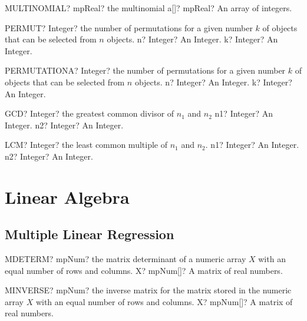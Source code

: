 \documentclass[12pt,a4paper,openany]{book}
\begin{document}
\begin{mpFunctionsExtract}
\mpWorksheetFunctionOneNotImplemented
{MULTINOMIAL? mpReal? the multinomial}
{a[]? mpReal? An array of integers.}
\end{mpFunctionsExtract}

\begin{mpFunctionsExtract}
\mpWorksheetFunctionTwoNotImplemented
{PERMUT? Integer? the number of permutations for a given number $k$ of objects that can be selected from $n$ objects.}
{n? Integer? An Integer.}
{k? Integer? An Integer.}
\end{mpFunctionsExtract}

\begin{mpFunctionsExtract}
\mpWorksheetFunctionTwoNotImplemented
{PERMUTATIONA? Integer? the number of permutations for a given number $k$ of objects that can be selected from $n$ objects.}
{n? Integer? An Integer.}
{k? Integer? An Integer.}
\end{mpFunctionsExtract}

\begin{mpFunctionsExtract}
\mpWorksheetFunctionTwoNotImplemented
{GCD? Integer? the greatest common divisor of $n_1$ and $n_2$}
{n1? Integer? An Integer.}
{n2? Integer? An Integer.}
\end{mpFunctionsExtract}

\begin{mpFunctionsExtract}
\mpWorksheetFunctionTwoNotImplemented
{LCM? Integer? the least common multiple of $n_1$ and $n_2$.}
{n1? Integer? An Integer.}
{n2? Integer? An Integer.}
\end{mpFunctionsExtract}

\chapter{Linear Algebra}

\section{Multiple Linear Regression}

\begin{mpFunctionsExtract}
\mpWorksheetFunctionOneNotImplemented
{MDETERM? mpNum? the matrix determinant of a numeric array $X$ with an equal number of rows and columns.}
{X? mpNum[]? A matrix of real numbers.}
\end{mpFunctionsExtract}

\begin{mpFunctionsExtract}
\mpWorksheetFunctionOneNotImplemented
{MINVERSE? mpNum? the  inverse matrix for the matrix stored in the numeric array  $X$ with an equal number of rows and columns.}
{X? mpNum[]? A matrix of real numbers.}
\end{mpFunctionsExtract}
\end{document}

